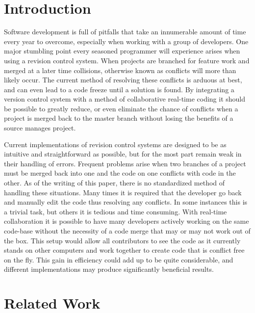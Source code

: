 \documentclass[11pt]{article}
\begin{document}
\vspace*{-.4in}
\section{Introduction}
\label{sec:introduction}
\vspace*{-.1in}

Software development is full of pitfalls that take an innumerable amount of time every year to overcome, especially when working with a group of developers. One major stumbling point every seasoned programmer will experience arises when using a revision control system. When projects are branched for feature work and merged at a later time collisions, otherwise known as conflicts will more than likely occur. The current method of resolving these conflicts is arduous at best, and can even lead to a code freeze until a solution is found. By integrating a version control system with a method of collaborative real-time coding it should be possible to greatly reduce, or even eliminate the chance of conflicts when a project is merged back to the master branch without losing the benefits of a source manages project.

Current implementations of revision control systems are designed to be as intuitive and straightforward as possible, but for the most part remain weak in their handling of errors. Frequent problems arise when two branches of a project must be merged back into one and the code on one conflicts with code in the other. As of the writing of this paper, there is no standardized method of handling these situations. Many times it is required that the developer go back and manually edit the code thus resolving any conflicts. In some instances this is a trivial task, but others it is tedious and time consuming. With real-time collaboration it is possible to have many developers actively working on the same code-base without the necessity of a code merge that may or may not work out of the box. This setup would allow all contributors to see the code as it currently stands on other computers and work together to create code that is conflict free on the fly. This gain in efficiency could add up to be quite considerable, and different implementations may produce significantly beneficial results.

\vspace*{-.1in}
\section{Related Work}
\label{sec:relatedwork}
\vspace*{-.1in}
\end{document}
